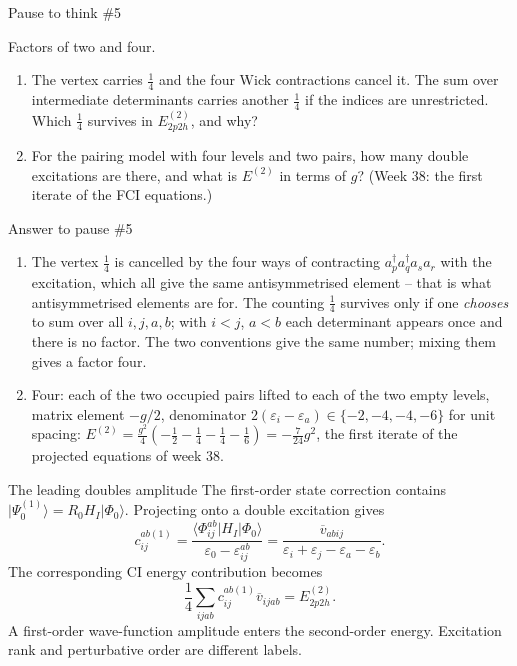 \documentclass[aspectratio=169,10pt]{beamer}
\newcounter{thinkctr}
\newcommand{\thinkq}[2]{%
  \stepcounter{thinkctr}%
  \vfill
  \begin{tcolorbox}[enhanced,colback=palewarm,colframe=warm,boxrule=1.2pt,arc=4pt,
    grow to left by=6mm,grow to right by=6mm,
    left=16pt,right=16pt,top=16pt,bottom=18pt,
    fonttitle=\bfseries\Large,fontupper=\Large,
    title={Pause to think \#\thethinkctr\hfill\mdseries\normalsize(about #1 min -- discuss with your neighbour)}]
  #2
  \end{tcolorbox}
  \vfill}
\newcommand{\thinka}[1]{%
  \vfill
  \begin{tcolorbox}[enhanced,colback=paleteal,colframe=teal,boxrule=1.2pt,arc=4pt,
    grow to left by=6mm,grow to right by=6mm,
    left=16pt,right=16pt,top=16pt,bottom=18pt,
    fonttitle=\bfseries\Large,fontupper=\large,
    title={Answer to pause \#\thethinkctr}]
  #1
  \end{tcolorbox}
  \vfill}
\newcommand{\ket}[1]{\vert #1\rangle}
\newcommand{\mel}[3]{\langle #1\lvert #2\rvert #3\rangle}
\newcommand{\cre}[1]{a_{#1}^{\dagger}}
\newcommand{\ann}[1]{a_{#1}}
\newcommand{\vbar}[4]{\overline v_{#1#2#3#4}}
\newcommand{\ph}{\Phi_0}
\begin{document}
\begin{frame}{Pause to think \#5}
\thinkq{3}{Factors of two and four.
\begin{enumerate}
\item The vertex carries \(\tfrac14\) and the four Wick contractions cancel it. The sum over intermediate determinants carries another \(\tfrac14\) if the indices are unrestricted. Which \(\tfrac14\) survives in \(E^{(2)}_{2p2h}\), and why?
\item For the pairing model with four levels and two pairs, how many double excitations are there, and what is \(E^{(2)}\) in terms of \(g\)? (Week 38: the first iterate of the FCI equations.)
\end{enumerate}}
\end{frame}

\begin{frame}{Answer to pause \#5}
\thinka{%
\begin{enumerate}
\item The vertex \(\tfrac14\) is cancelled by the four ways of contracting \(\cre{p}\cre{q}\ann{s}\ann{r}\) with the excitation, which all give the same antisymmetrised element -- that is what antisymmetrised elements are for. The counting \(\tfrac14\) survives only if one \emph{chooses} to sum over all \(i,j,a,b\); with \(i<j\), \(a<b\) each determinant appears once and there is no factor. The two conventions give the same number; mixing them gives a factor four.
\item Four: each of the two occupied pairs lifted to each of the two empty levels, matrix element \(-g/2\), denominator \(2(\varepsilon_i-\varepsilon_a)\in\{-2,-4,-4,-6\}\) for unit spacing: \(E^{(2)}=\frac{g^2}{4}\left(-\frac12-\frac14-\frac14-\frac16\right)=-\frac{7}{24}g^2\), the first iterate of the projected equations of week 38.
\end{enumerate}}
\end{frame}

\begin{frame}{The leading doubles amplitude}
The first-order state correction contains
\(\ket{\Psi_0^{(1)}}=R_0H_I\ket{\ph}\).
Projecting onto a double excitation gives
\[
\boxed{c_{ij}^{ab(1)}=
\frac{\mel{\Phi_{ij}^{ab}}{H_I}{\ph}}
 {\varepsilon_0-\varepsilon_{ij}^{ab}}
=\frac{\vbar{a}{b}{i}{j}}
 {\varepsilon_i+\varepsilon_j-\varepsilon_a-\varepsilon_b}.}
\]
The corresponding CI energy contribution becomes
\[
\frac14\sum_{ijab}c_{ij}^{ab(1)}\vbar{i}{j}{a}{b}
=E^{(2)}_{2p2h}.
\]
\small A first-order wave-function amplitude enters the second-order energy. Excitation rank and perturbative order are different labels.
\end{frame}
\end{document}
